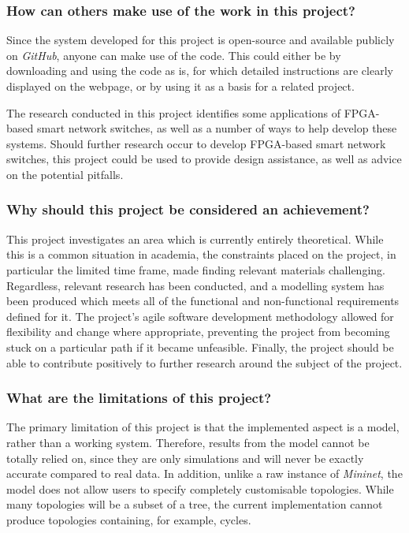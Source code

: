 \subsubsection{How can others make use of the work in this project?}
Since the system developed for this project is open-source and available publicly on \textit{GitHub}, anyone can make use of the code. This could either be by downloading and using the code as is, for which detailed instructions are clearly displayed on the webpage, or by using it as a basis for a related project.

The research conducted in this project identifies some applications of FPGA-based smart network switches, as well as a number of ways to help develop these systems. Should further research occur to develop FPGA-based smart network switches, this project could be used to provide design assistance, as well as advice on the potential pitfalls.

\subsubsection{Why should this project be considered an achievement?}
This project investigates an area which is currently entirely theoretical. While this is a common situation in academia, the constraints placed on the project, in particular the limited time frame, made finding relevant materials challenging. Regardless, relevant research has been conducted, and a modelling system has been produced which meets all of the functional and non-functional requirements defined for it. The project's agile software development methodology allowed for flexibility and change where appropriate, preventing the project from becoming stuck on a particular path if it became unfeasible. Finally, the project should be able to contribute positively to further research around the subject of the project.

\subsubsection{What are the limitations of this project?}
The primary limitation of this project is that the implemented aspect is a model, rather than a working system. Therefore, results from the model cannot be totally relied on, since they are only simulations and will never be exactly accurate compared to real data. In addition, unlike a raw instance of \textit{Mininet}, the model does not allow users to specify completely customisable topologies. While many topologies will be a subset of a tree, the current implementation cannot produce topologies containing, for example, cycles.
